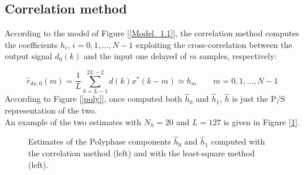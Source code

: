 \documentclass[a4paper, 12pt]{report}
\begin{document}
\subsection*{Correlation method}
According to the model of Figure [\ref{Model_1.1}], the correlation method computes the coefficients $h_i$, $i=0,1,\dots,N-1$ exploiting the cross-correlation between the output signal $d_0(k)$ and the input one delayed of $m$ samples, respectively:

\begin{equation}
\hat{r}_{dx,0}(m) = \frac{1}{L} \sum_{k=L-1}^{2L-2}d(k)x^*(k-m) \simeq h_m \quad\quad m=0,1,\dots,N-1
\end{equation}
According to Figure [\ref{poly}], once computed both $\hat{h}_0$ and $\hat{h}_1$, $\hat{h}$ is just the P/S representation of the two.\\
An example of the two estimates with $N_h=20$ and $L=127$ is given in Figure [\ref{h_cor}].

\begin{figure}[H]
	\centering
	\caption{Estimates of the Polyphase components $\hat{h}_0$ and $\hat{h}_1$ computed with the correlation method (left) and with the least-square method (left).}\label{h_cor}
\end{figure}
\end{document}
